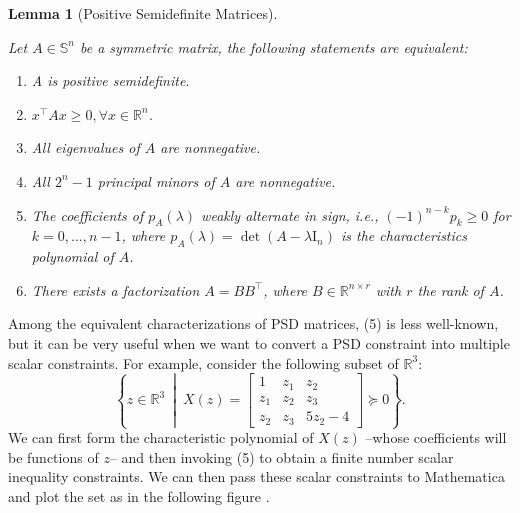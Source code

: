 \documentclass[
]{book}
\newtheorem{lemma}{Lemma}[chapter]
\theoremstyle{definition}
\theoremstyle{definition}
\theoremstyle{definition}
\theoremstyle{definition}
\theoremstyle{remark}
\begin{document}
\begin{lemma}[Positive Semidefinite Matrices]
\protect\hypertarget{lem:PositiveSemidefinite}{}\label{lem:PositiveSemidefinite}

Let \(A \in \mathbb{S}^{n}\) be a symmetric matrix, the following statements are equivalent:

\begin{enumerate}
\def\labelenumi{\arabic{enumi}.}
\item
  A is positive semidefinite.
\item
  \(x^\top A x \geq 0, \forall x \in \mathbb{R}^{n}\).
\item
  All eigenvalues of \(A\) are nonnegative.
\item
  All \(2^n-1\) principal minors of \(A\) are nonnegative.
\item
  The coefficients of \(p_A(\lambda)\) weakly alternate in sign, i.e., \((-1)^{n-k} p_k \geq 0\) for \(k=0,\dots,n-1\), where \(p_A(\lambda) = \det (A - \lambda \mathrm{I}_n)\) is the characteristics polynomial of \(A\).
\item
  There exists a factorization \(A = BB^\top\), where \(B \in \mathbb{R}^{n \times r}\) with \(r\) the rank of \(A\).
\end{enumerate}

\end{lemma}

Among the equivalent characterizations of PSD matrices, (5) is less well-known, but it can be very useful when we want to convert a PSD constraint into multiple scalar constraints. For example, consider the following subset of \(\mathbb{R}^{3}\):
\[
 \left\{ z \in \mathbb{R}^{3} \ \middle\vert\ X(z) = \begin{bmatrix} 1 & z_1 & z_2 \\ z_1 & z_2 & z_3 \\ z_2 & z_3 & 5 z_2 - 4  \end{bmatrix} \succeq 0  \right\} .
\]
We can first form the characteristic polynomial of \(X(z)\) --whose coefficients will be functions of \(z\)-- and then invoking (5) to obtain a finite number scalar inequality constraints. We can then pass these scalar constraints to Mathematica and plot the set as in the following figure \citep{yang22mp-inexact}.
\end{document}
